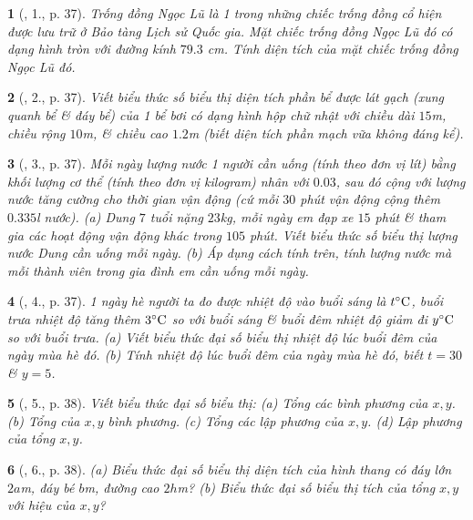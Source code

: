 \documentclass{article}
\newtheorem{baitoan}{}
\begin{document}
\begin{baitoan}[\cite{SBT_Toan_7_Canh_Dieu_tap_2}, 1., p. 37]
	Trống đồng Ngọc Lũ là 1 trong những chiếc trống đồng cổ hiện được lưu trữ ở Bảo tàng Lịch sử Quốc gia. Mặt chiếc trống đồng Ngọc Lũ đó có dạng hình tròn với đường kính $79.3$ \emph{cm}. Tính diện tích của mặt chiếc trống đồng Ngọc Lũ đó.
\end{baitoan}

\begin{baitoan}[\cite{SBT_Toan_7_Canh_Dieu_tap_2}, 2., p. 37]
	Viết biểu thức số biểu thị diện tích phần bể được lát gạch (xung quanh bể \& đáy bể) của 1 bể bơi có dạng hình hộp chữ nhật với chiều dài $15$\emph{m}, chiều rộng $10$\emph{m}, \& chiều cao $1.2$\emph{m} (biết diện tích phần mạch vữa không đáng kể).
\end{baitoan}

\begin{baitoan}[\cite{SBT_Toan_7_Canh_Dieu_tap_2}, 3., p. 37]
	Mỗi ngày lượng nước 1 người cần uống (tính theo đơn vị lít) bằng khối lượng cơ thể (tính theo đơn vị kilogram) nhân với $0.03$, sau đó cộng với lượng nước tăng cường cho thời gian vận động (cứ mỗi $30$ phút vận động cộng thêm $0.335$\emph{l} nước). (a) Dung $7$ tuổi nặng $23$\emph{kg}, mỗi ngày em đạp xe $15$ phút \& tham gia các hoạt động vận động khác trong $105$ phút. Viết biểu thức số biểu thị lượng nước Dung cần uống mỗi ngày. (b) Áp dụng cách tính trên, tính lượng nước mà mỗi thành viên trong gia đình em cần uống mỗi ngày.
\end{baitoan}

\begin{baitoan}[\cite{SBT_Toan_7_Canh_Dieu_tap_2}, 4., p. 37]
	1 ngày hè người ta đo được nhiệt độ vào buổi sáng là $t^\circ{\rm C}$, buổi trưa nhiệt độ tăng thêm $3^\circ{\rm C}$ so với buổi sáng \& buổi đêm nhiệt độ giảm đi $y^\circ{\rm C}$ so với buổi trưa. (a) Viết biểu thức đại số biểu thị nhiệt độ lúc buổi đêm của ngày mùa hè đó. (b) Tính nhiệt độ lúc buổi đêm của ngày mùa hè đó, biết $t = 30$ \& $y = 5$.
\end{baitoan}

\begin{baitoan}[\cite{SBT_Toan_7_Canh_Dieu_tap_2}, 5., p. 38]
	Viết biểu thức đại số biểu thị: (a) Tổng các bình phương của $x,y$. (b) Tổng của $x,y$ bình phương. (c) Tổng các lập phương của $x,y$. (d) Lập phương của tổng $x,y$.
\end{baitoan}

\begin{baitoan}[\cite{SBT_Toan_7_Canh_Dieu_tap_2}, 6., p. 38]
	(a) Biểu thức đại số biểu thị diện tích của hình thang có đáy lớn $2a$\emph{m}, đáy bé $b$\emph{m}, đường cao $2h$\emph{m}? (b) Biểu thức đại số biểu thị tích của tổng $x,y$ với hiệu của $x,y$?
\end{baitoan}
\end{document}
